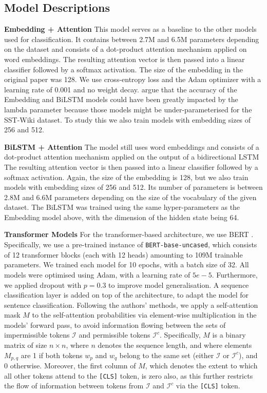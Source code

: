 \subsection{Model Descriptions}
\textbf{Embedding + Attention} This model serves as a baseline to the other models used for classification. It contains between 2.7M and 6.5M parameters depending on the dataset and consists of a dot-product attention mechanism applied on word embeddings. The resulting attention vector is then passed into a linear classifier followed by a softmax activation. The size of the embedding in the original paper was 128. We use cross-entropy loss and the Adam optimizer with a learning rate of 0.001 and no weight decay. \cite{pruthi-etal-2020-learning} argue that the accuracy of the Embedding and BiLSTM models could have been greatly impacted by the lambda parameter because those models might be under-parameterised for the SST-Wiki dataset. To study this we also train models with embedding sizes of 256 and 512.

\textbf{BiLSTM + Attention} The model still uses word embeddings and consists of a dot-product attention mechanism applied on the output of a bidirectional LSTM \citep{bilstm} The resulting attention vector is then passed into a linear classifier followed by a softmax activation. Again, the size of the embedding is 128, but we also train models with embedding sizes of 256 and 512. Its number of parameters is between 2.8M and 6.6M parameters depending on the size of the vocabulary of the given dataset. The BiLSTM was trained using the same hyper-parameters as the Embedding model above, with the dimension of the hidden state being 64.

\textbf{Transformer Models} For the transformer-based architecture, we use BERT \citep{devlin2018bert}. Specifically, we use a pre-trained instance of \texttt{BERT-base-uncased}, which consists of 12 transformer blocks (each with 12 heads) amounting to 109M trainable parameters. We trained each model for 10 epochs, with a batch size of 32. All models were optimised using Adam, with a learning rate of $5e-5$. Furthermore, we applied dropout with $p = 0.3$ to improve model generalisation. A sequence classification layer is added on top of the architecture, to adapt the model for sentence classification. Following the authors' methods, we apply a self-attention mask $M$ to the self-attention probabilities via element-wise multiplication in the models' forward pass, to avoid information flowing between the sets of impermissible tokens $\mathcal{I}$ and permissible tokens $\mathcal{I}^c$. Specifically, $M$ is a binary matrix of size $n \times n$, where $n$ denotes the sequence length, and where elements $M_{p,q}$ are 1 if both tokens $w_p$ and $w_q$ belong to the same set (either $\mathcal{I}$ or $\mathcal{I}^c$), and 0 otherwise. Moreover, the first column of $M$, which denotes the extent to which all other tokens attend to the \texttt{[CLS]} token, is zero also, as this further restricts the flow of information between tokens from $\mathcal{I}$ and $\mathcal{I}^c$ via the \texttt{[CLS]} token.


